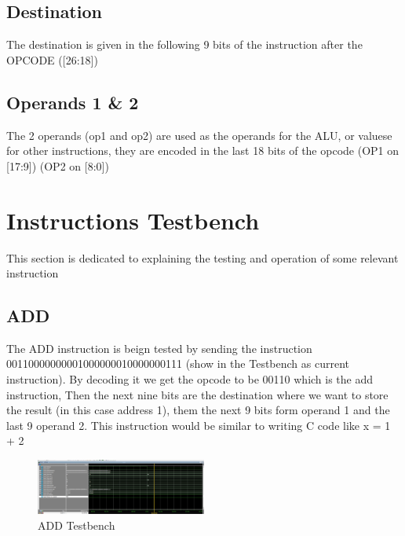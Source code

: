 \documentclass[9pt,a4paper,twoside]{tau}
\begin{document}
        

        \subsection{Destination}
        The destination is given in the following 9 bits of the instruction after the OPCODE ([26:18]) 

        \subsection{Operands 1 \& 2}
        The 2 operands (op1 and op2) are used as the operands for the ALU, or valuese for other instructions, they are encoded in the last 18 bits of the opcode (OP1 on [17:9]) (OP2 on [8:0])
        
    
\section{Instructions Testbench}
This section is dedicated to explaining the testing and operation of some relevant instruction
        \subsection{ADD}

            The ADD instruction is beign tested by sending the instruction 00110000000001000000010000000111 (show in the Testbench as current instruction). By decoding it we get the opcode to be 00110 which is the add instruction, Then the next nine bits are the destination where we want to store the result (in this case address 1), them the next 9 bits form operand 1 and the last 9 operand 2. This instruction would be similar to writing C code like x = 1 + 2

            \begin{figure}[h]  %
                \centering  %
                \includegraphics[width=0.5\textwidth]{images_tb/add_tb.png}
                \caption{ADD Testbench}
                \label{fig:ISA Format}
            \end{figure}
\end{document}
